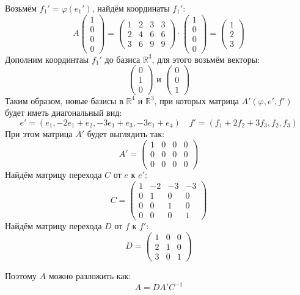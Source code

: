 \documentclass[a4paper]{article}
\newcommand{\mat}[1]{\begin{pmatrix} #1 \end{pmatrix}}
\renewcommand{\phi}{\varphi}
\newcommand{\RR}{\mathbb{R}}
\begin{document}
\begin{enumerate}
    Возьмём $f_1' = \phi(e_1')$, найдём координаты $f_1'$:
    $$A\mat{1\\0\\0\\0} = \begin{pmatrix} 1 & 2 & 3 & 3 \\ 2 & 4 & 6 & 6 \\ 3 & 6 & 9 & 9 \end{pmatrix}\cdot \mat{1\\0\\0\\0} = \mat{1\\2\\3}$$
    Дополним координтаы $f_1'$ до базиса $\RR^3$, для этого возьмём векторы:
    $$\mat{0 \\ 1\\0} \text{ и } \mat{0\\0\\1}$$
    Таким образом, новые базисы в $\RR^4$ и $\RR^3$, при которых матрица $A'(\phi, e', f')$ будет иметь диагональный вид:
    $$e' = (e_1, -2e_1+e_2, -3e_1+e_3, -3e_1+e_4) \quad f' = (f_1+2f_2+3f_3, f_2, f_3)$$
    При этом матрица $A'$ будет выглядить так:
    $$A' = \mat{1 & 0 &  0 & 0\\0 &  0 & 0 & 0\\0 & 0 & 0 & 0}$$
    Найдём матрицу перехода $C$ от $e$ к $e'$:
    $$C = \mat{1&-2&-3&-3\\0&1&0&0\\0&0&1&0\\0&0&0&1}$$
    Найдём матрицу перехода $D$ от $f$ к $f'$:
    $$D = \mat{  1 & 0 & 0 \\
    2 & 1 & 0 \\
    3 & 0 & 1}$$

    Поэтому $A$ можно разложить как:
    $$A = DA'C^{-1}$$\\


\end{enumerate}
\end{document}
